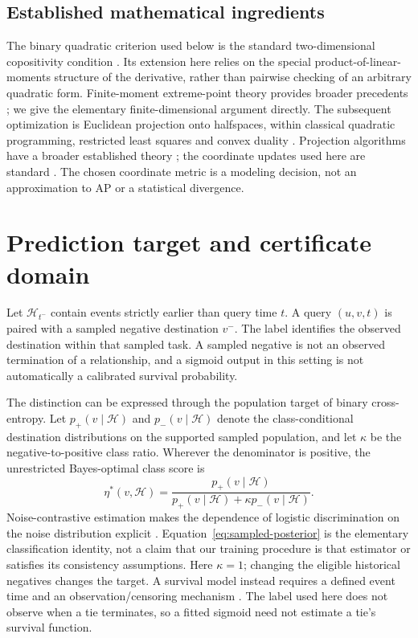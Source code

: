 \documentclass[pdflatex,sn-vancouver-num]{sn-jnl}
\theoremstyle{thmstyleone}
\begin{document}
\subsection{Established mathematical ingredients}
The binary quadratic criterion used below is the standard two-dimensional copositivity condition \cite{copositive}. Its extension here relies on the special product-of-linear-moments structure of the derivative, rather than pairwise checking of an arbitrary quadratic form. Finite-moment extreme-point theory provides broader precedents \cite{moment,pinelis}; we give the elementary finite-dimensional argument directly. The subsequent optimization is Euclidean projection onto halfspaces, within classical quadratic programming, restricted least squares and convex duality \cite{hildreth,dykstra,convex}. Projection algorithms have a broader established theory \cite{projection}; the coordinate updates used here are standard \cite{coordinate}. The chosen coordinate metric is a modeling decision, not an approximation to AP or a statistical divergence.

\section{Prediction target and certificate domain}\label{sec:domain}
Let $\mathcal H_{t^-}$ contain events strictly earlier than query time $t$. A query $(u,v,t)$ is paired with a sampled negative destination $v^-$. The label identifies the observed destination within that sampled task. A sampled negative is not an observed termination of a relationship, and a sigmoid output in this setting is not automatically a calibrated survival probability.

The distinction can be expressed through the population target of binary cross-entropy. Let $p_+(v\mid\mathcal H)$ and $p_-(v\mid\mathcal H)$ denote the class-conditional destination distributions on the supported sampled population, and let $\kappa$ be the negative-to-positive class ratio. Wherever the denominator is positive, the unrestricted Bayes-optimal class score is
\begin{equation}\label{eq:sampled-posterior}
\eta^*(v,\mathcal H)=
\frac{p_+(v\mid\mathcal H)}
{p_+(v\mid\mathcal H)+\kappa p_-(v\mid\mathcal H)}.
\end{equation}
Noise-contrastive estimation makes the dependence of logistic discrimination on the noise distribution explicit \cite{nce}. Equation~\eqref{eq:sampled-posterior} is the elementary classification identity, not a claim that our training procedure is that estimator or satisfies its consistency assumptions. Here $\kappa=1$; changing the eligible historical negatives changes the target. A survival model instead requires a defined event time and an observation/censoring mechanism \cite{aalen}. The label used here does not observe when a tie terminates, so a fitted sigmoid need not estimate a tie's survival function.
\end{document}

